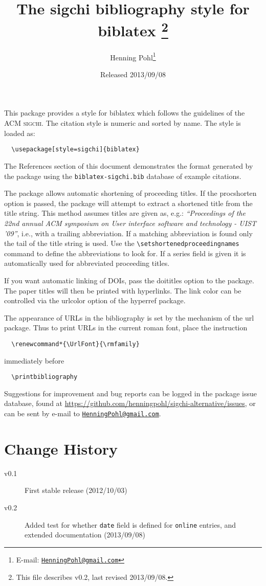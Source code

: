 \documentclass[a4paper]{ltxdoc}
\author{Henning Pohl\thanks{E-mail: 
  \href{mailto:HenningPohl@gmail.com}
  {\texttt{HenningPohl@gmail.com}}}}
\title{The \textsf{sigchi} bibliography style for \textsf{biblatex}%
  \footnote{This file describes v0.2, last revised 2013/09/08.}}
\date{Released 2013/09/08}
\begin{document}
\maketitle

This package provides a style for \textsf{biblatex} which follows the
guidelines of the \textsc{ACM sigchi}.
The citation style is numeric and sorted by name.
The style is loaded as:
\begin{verbatim}
  \usepackage[style=sigchi]{biblatex}
\end{verbatim}
The References section of this document demonstrates the format 
generated by the package using the \texttt{biblatex-sigchi.bib} database
of example citations.

The package allows automatic shortening of proceeding titles.
If the \textsf{procshorten} option is passed, the package will attempt to extract a shortened title from the title string.
This method assumes titles are given as, e.g.: \textit{``Proceedings of the 22nd annual ACM symposium on User interface software and technology - UIST '09''}, i.e., with a trailing abbreviation.
If a matching abbreviation is found only the tail of the title string is used.
Use the \verb|\setshortenedproceedingnames| command to define the abbreviations to look for.
If a \textsf{series} field is given it is automatically used for abbreviated proceeding titles.

If you want automatic linking of \textsf{DOIs}, pass the \textsf{doititles} option to the package.
The paper titles will then be printed with hyperlinks.
The link color can be controlled via the \textsf{urlcolor} option of the \textsf{hyperref} package.

The appearance of URLs in the bibliography is set by the mechanism of the
\textsf{url} package.
Thus to print URLs in the current roman font,
place the instruction
\begin{verbatim}
  \renewcommand*{\UrlFont}{\rmfamily}
\end{verbatim}
immediately before
\begin{verbatim}
  \printbibliography
\end{verbatim}

Suggestions for improvement and bug reports can be logged in the package
issue database, found at 
\url{https://github.com/henningpohl/sigchi-alternative/issues}, 
or can be sent by e-mail to 
\href{mailto:HenningPohl@gmail.com}{\texttt{HenningPohl@gmail.com}}.

\nocite{*}
\printbibliography

\section*{Change History}
\begin{multicols}{2}
\begin{description}
  \item[v0.1] First stable release (2012/10/03)
  \item[v0.2] Added test for whether \texttt{date} field is defined for \texttt{online} entries, and extended documentation (2013/09/08)
\end{description}
\end{multicols}
\end{document}
